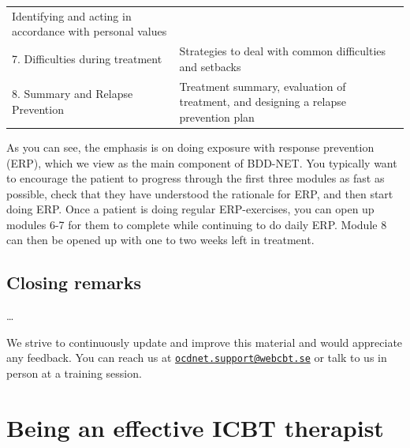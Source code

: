 \documentclass[]{book}
\theoremstyle{definition}
\theoremstyle{definition}
\theoremstyle{definition}
\theoremstyle{remark}
\begin{document}
\begin{longtable}[]{@{}ll@{}}
\begin{minipage}[t]{0.47\columnwidth}
Identifying and acting in accordance with personal values\strut
\end{minipage}\tabularnewline
\begin{minipage}[t]{0.47\columnwidth}\raggedright
7. Difficulties during treatment\strut
\end{minipage} & \begin{minipage}[t]{0.47\columnwidth}\raggedright
Strategies to deal with common difficulties and setbacks\strut
\end{minipage}\tabularnewline
\begin{minipage}[t]{0.47\columnwidth}\raggedright
8. Summary and Relapse Prevention\strut
\end{minipage} & \begin{minipage}[t]{0.47\columnwidth}\raggedright
Treatment summary, evaluation of treatment, and designing a relapse
prevention plan\strut
\end{minipage}\tabularnewline
\bottomrule
\end{longtable}

As you can see, the emphasis is on doing exposure with response
prevention (ERP), which we view as the main component of BDD-NET. You
typically want to encourage the patient to progress through the first
three modules as fast as possible, check that they have understood the
rationale for ERP, and then start doing ERP. Once a patient is doing
regular ERP-exercises, you can open up modules 6-7 for them to complete
while continuing to do daily ERP. Module 8 can then be opened up with
one to two weeks left in treatment.

\hypertarget{closing-remarks-1}{%
\section{Closing remarks}\label{closing-remarks-1}}

\ldots{}

We strive to continuously update and improve this material and would
appreciate any feedback. You can reach us at
\href{mailto:ocdnet.support@webcbt.se}{\nolinkurl{ocdnet.support@webcbt.se}}
or talk to us in person at a training session.

\hypertarget{being-an-effective-icbt-therapist}{%
\chapter{Being an effective ICBT
therapist}\label{being-an-effective-icbt-therapist}}
\end{document}
